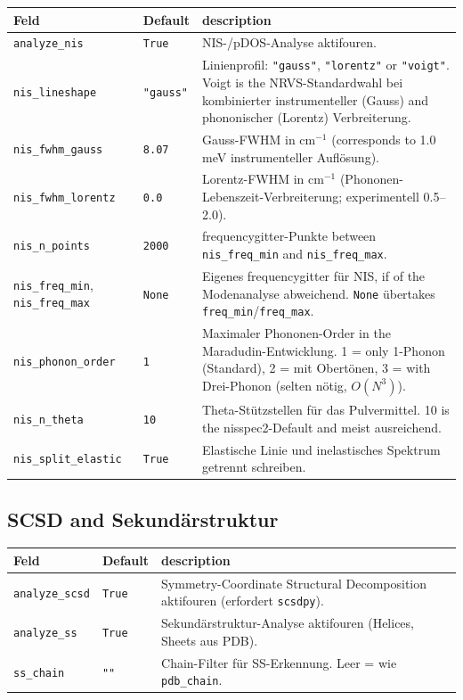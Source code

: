 \documentclass[11pt,a4paper,twoside]{article}
\theoremstyle{remark}
\begin{document}
\begin{longtable}{p{} p{} p{}}
\toprule
\textbf{Feld} & \textbf{Default} & \textbf{description} \\
\midrule
\endhead
\texttt{analyze\_nis}     & \texttt{True} & NIS-/pDOS-Analyse aktifouren. \\
\texttt{nis\_lineshape}   & \texttt{"gauss"} & Linienprofil:
  \texttt{"gauss"}, \texttt{"lorentz"} or \texttt{"voigt"}. Voigt
  is the NRVS-Standardwahl bei kombinierter instrumenteller (Gauss)
  and phononischer (Lorentz) Verbreiterung. \\
\texttt{nis\_fwhm\_gauss} & \texttt{8.07} & Gauss-FWHM in cm$^{-1}$
  (corresponds to 1.0 meV instrumenteller Aufl\"osung). \\
\texttt{nis\_fwhm\_lorentz} & \texttt{0.0} & Lorentz-FWHM in cm$^{-1}$
  (Phononen-Lebenszeit-Verbreiterung; experimentell 0.5--2.0). \\
\texttt{nis\_n\_points}   & \texttt{2000}  & frequencygitter-Punkte
  between \texttt{nis\_freq\_min} and \texttt{nis\_freq\_max}. \\
\texttt{nis\_freq\_min}, \texttt{nis\_freq\_max} & \texttt{None}     &
  Eigenes frequencygitter f\"ur NIS, if of the Modenanalyse abweichend.
  \texttt{None} \"ubertakes \texttt{freq\_min}/\texttt{freq\_max}. \\
\texttt{nis\_phonon\_order} & \texttt{1} & Maximaler Phononen-Order
  in the Maradudin-Entwicklung. 1 = only 1-Phonon (Standard), 2 = mit
  Obert\"onen, 3 = with Drei-Phonon (selten n\"otig, $O(N^3)$). \\
\texttt{nis\_n\_theta}    & \texttt{10}   & Theta-St\"utzstellen f\"ur das
  Pulvermittel. 10 is the nisspec2-Default and meist ausreichend. \\
\texttt{nis\_split\_elastic} & \texttt{True} & Elastische Linie und
  inelastisches Spektrum getrennt schreiben. \\
\bottomrule
\end{longtable}

\subsection{SCSD and Sekund\"arstruktur}

\begin{longtable}{p{} p{} p{}}
\toprule
\textbf{Feld} & \textbf{Default} & \textbf{description} \\
\midrule
\endhead
\texttt{analyze\_scsd}  & \texttt{True} & Symmetry-Coordinate
  Structural Decomposition aktifouren (erfordert \texttt{scsdpy}). \\
\texttt{analyze\_ss}    & \texttt{True} & Sekund\"arstruktur-Analyse
  aktifouren (Helices, Sheets aus PDB). \\
\texttt{ss\_chain}      & \texttt{""}   & Chain-Filter f\"ur
  SS-Erkennung. Leer = wie \texttt{pdb\_chain}. \\
\bottomrule
\end{longtable}
\end{document}
